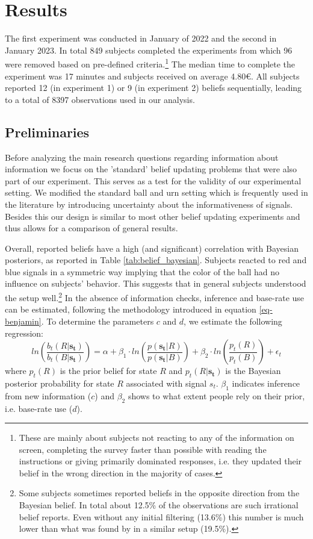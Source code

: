 \documentclass{article}
\begin{document}
\section{Results}

The first experiment was conducted in January of 2022 and the second in January 2023. In total 849 subjects completed the experiments from which 96 were removed based on pre-defined criteria.\footnote{These are mainly about subjects not reacting to any of the information on screen, completing the survey faster than possible with reading the instructions or giving primarily dominated responses, i.e. they updated their belief in the wrong direction in the majority of cases.} The median time to complete the experiment was 17 minutes and subjects received on average 4.80\euro. All subjects reported 12 (in experiment 1) or 9 (in experiment 2) beliefs sequentially, leading to a total of 8397 observations used in our analysis. 

\subsection{Preliminaries}

Before analyzing the main research questions regarding information about information we focus on the 'standard' belief updating problems that were also part of our experiment. This serves as a test for the validity of our experimental setting. We modified the standard ball and urn setting which is frequently used in the literature by introducing uncertainty about the informativeness of signals. Besides this our design is similar to most other belief updating experiments and thus allows for a comparison of general results.

Overall, reported beliefs have a high (and significant) correlation with Bayesian posteriors, as reported in Table \ref{tab:belief_bayesian}. Subjects reacted to red and blue signals in a symmetric way implying that the color of the ball had no influence on subjects' behavior. This suggests that in general subjects understood the setup well.\footnote{Some subjects sometimes reported beliefs in the opposite direction from the Bayesian belief. In total about 12.5\% of the observations are such irrational belief reports. Even without any initial filtering (13.6\%) this number is much lower than what was found by \cite{Goncalves2021} in a similar setup (19.5\%).} In the absence of information checks, inference and base-rate use can be estimated, following the methodology introduced in equation \ref{eq-benjamin}. To determine the parameters $c$ and $d$, we estimate the following regression:
\begin{equation}
\label{eq-reg-inference}
ln(\frac{b_t(R|\mathbf{s_t})}{b_t(B|\mathbf{s_t})}) = \alpha + \beta_1 \cdot ln(\frac{p(\mathbf{s_t}|R)}{p(\mathbf{s_t}|B)}) + \beta_2 \cdot ln(\frac{p_t(R)}{p_t(B)}) + \epsilon_t
\end{equation}
where $p_t(R)$ is the prior belief for state $R$ and $p_t(R|\mathbf{s_t})$ is the Bayesian posterior probability for state $R$ associated with signal $s_t$. $\beta_1$ indicates inference from new information ($c$) and $\beta_2$ shows to what extent people rely on their prior, i.e. base-rate use ($d$). 
\end{document}

